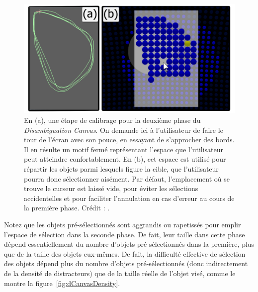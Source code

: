 	\begin{figure}[ht]
		\centering
		\includegraphics[width=\textwidth]{figures/ch2/dCanvasLayout}
		\caption[\emph{Disambiguation Canvas} -- calibrage]{En (a), une étape de calibrage pour la deuxième phase du \emph{Disambiguation Canvas}. On demande ici à l'utilisateur de faire le tour de l'écran avec son pouce, en essayant de s'approcher des bords. Il en résulte un motif fermé représentant l'espace que l'utilisateur peut atteindre confortablement. En (b), cet espace est utilisé pour répartir les objets parmi lesquels figure la cible, que l'utilisateur pourra donc sélectionner aisément. Par défaut, l'emplacement où se trouve le curseur est laissé vide, pour éviter les sélections accidentelles et pour faciliter l'annulation en cas d'erreur au cours de la première phase. Crédit : \cite{debarba2013disambiguation}.}
		\label{fig:dCanvasLayout}
	\end{figure}
	
	Notez que les objets pré-sélectionnés sont aggrandis ou rapetissés pour emplir l'espace de sélection dans la seconde phase. De fait, leur taille dans cette phase dépend essentiellement du nombre d'objets pré-sélectionnés dans la première, plus que de la taille des objets eux-mêmes. De fait, la difficulté effective de sélection des objets dépend plus du nombre d'objets pré-sélectionnés (donc indirectement de la densité de distracteurs) que de la taille réelle de l'objet visé, comme le montre la figure~\ref{fig:dCanvasDensity}.
	
